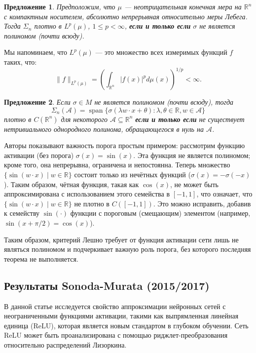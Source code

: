 \documentclass[12pt]{article}
\newtheorem{proposition}{Предложение}
\begin{document}
		\begin{proposition}
			Предположим, что $\mu$ — неотрицательная конечная мера на $\mathbb{R}^n$ с компактным носителем, абсолютно непрерывная относительно меры Лебега. Тогда $\Sigma_n$ плотно в $L^p(\mu)$, $1 \leq p < \infty$, \textbf{если и только если} $\sigma$ не является полиномом (почти всюду).
		\end{proposition}
		
		Мы напоминаем, что $L^p(\mu)$ — это множество всех измеримых функций $f$ таких, что:
		\[
		\|f\|_{L^p(\mu)} = \left( \int_{\mathbb{R}^n} |f(x)|^p d\mu(x) \right)^{1/p} < \infty.
		\]
		
		\begin{proposition}
			Если $\sigma \in M$ не является полиномом (почти всюду), тогда
			\[
			\Sigma_n(\mathcal{A}) = \operatorname{span}\{ \sigma(\lambda w \cdot x + \theta) : \lambda, \theta \in \mathbb{R}, w \in \mathcal{A} \}
			\]
			плотно в $C(\mathbb{R}^n)$ для некоторого $\mathcal{A} \subseteq \mathbb{R}^n$ \textbf{если и только если} не существует нетривиального однородного полинома, обращающегося в нуль на $\mathcal{A}$.
		\end{proposition}
		
	    Авторы показывают важность порога простым примером: рассмотрим функцию активации (без порога) $\sigma(x) = \sin(x)$. Эта функция не является полиномом; кроме того, она непрерывна, ограничена и непостоянна. Теперь множество $\{\sin(w \cdot x) \mid w \in \mathbb{R}\}$ состоит только из нечётных функций ($\sigma(x) = -\sigma(-x)$). Таким образом, чётная функция, такая как $\cos(x)$, не может быть аппроксимирована с использованием этого семейства в $[-1, 1]$, что означает, что $\{\sin(w \cdot x) \mid w \in \mathbb{R}\}$ не плотно в $C([-1, 1])$. Это можно исправить, добавив к семейству $\sin(\cdot)$ функции с пороговым (смещающим) элементом (например, $\sin(x + \pi/2) = \cos(x)$). 
	    
	    Таким образом, критерий Лешно требует от функция активации сети лишь не являться полиномом и подчеркивает важную роль порога, без которого последняя теорема не выполняется.
	
	
\subsection{Результаты Sonoda-Murata (2015/2017)}

В данной статье исследуется свойство аппроксимации нейронных сетей с неограниченными функциями активации, такими как выпрямленная линейная единица (ReLU), которая является новым стандартом в глубоком обучении. Сеть ReLU может быть проанализирована с помощью риджлет-преобразования относительно распределений Лизоркина. 
\end{document}
